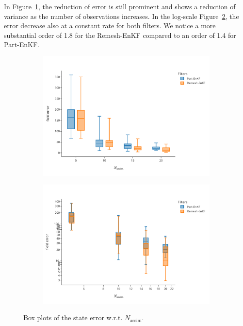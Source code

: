 In Figure~\ref{fig:na_1}, the reduction of error is still prominent and shows a reduction of variance as the number of observations increases. In the log-scale Figure~\ref{fig:na_2}, the error decrease also at a constant rate for both filters. We notice a more substantial order of 1.8 for the Remesh-EnKF compared to an order of 1.4 for Part-EnKF.

\begin{figure}[h!]
    \centering
    \begin{subfigure}{0.49\linewidth}
        \centering
        \includegraphics[width=\linewidth]{./images/app2d/final/MSE_na_box.pdf}
        \caption{}
        \label{fig:na_1}

    \end{subfigure}
    \begin{subfigure}{0.49\linewidth}
        \centering
        \includegraphics[width=\linewidth]{./images/app2d/final/MSE_na_box_log_log.pdf}
        \caption{}
        \label{fig:na_2}
    \end{subfigure}
    \caption{Box plots of the state error w.r.t. $N_{\text{assim}}$.}
    \label{fig:na}

\end{figure}


